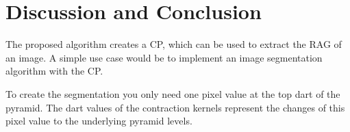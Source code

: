 \documentclass[12pt]{article}
\begin{document}



\section{Discussion and Conclusion}%
\label{sec:discussion}

The proposed algorithm creates a CP, which can be used to extract the RAG of an image.
A simple use case would be to implement an image segmentation algorithm with the CP\@.
\par
To create the segmentation you only need one pixel value at the top dart of the pyramid.
The dart values of the contraction kernels represent the changes of this pixel value to the underlying pyramid levels.




\end{document}
